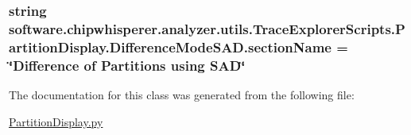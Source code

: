 \subsubsection[{section\+Name}]{\setlength{\rightskip}{0pt plus 5cm}string software.\+chipwhisperer.\+analyzer.\+utils.\+Trace\+Explorer\+Scripts.\+Partition\+Display.\+Difference\+Mode\+S\+A\+D.\+section\+Name = \char`\"{}Difference of Partitions using S\+A\+D\char`\"{}\hspace{0.3cm}{\ttfamily [static]}}\label{classsoftware_1_1chipwhisperer_1_1analyzer_1_1utils_1_1TraceExplorerScripts_1_1PartitionDisplay_1_1DifferenceModeSAD_a06df339805ddf5ce09ba515252edc2de}


The documentation for this class was generated from the following file\+:\begin{DoxyCompactItemize}
\item 
\hyperlink{PartitionDisplay_8py}{Partition\+Display.\+py}\end{DoxyCompactItemize}
